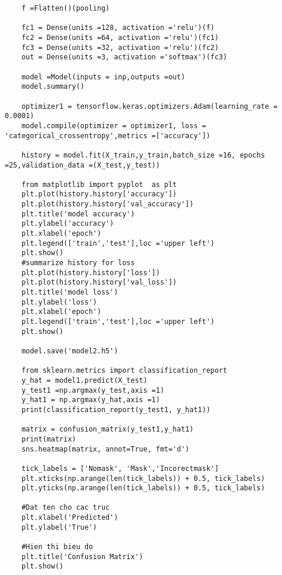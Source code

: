 \begin{lstlisting}
	f =Flatten()(pooling)
	
	fc1 = Dense(units =128, activation ='relu')(f)
	fc2 = Dense(units =64, activation ='relu')(fc1)
	fc3 = Dense(units =32, activation ='relu')(fc2)
	out = Dense(units =3, activation ='softmax')(fc3)
	
	model =Model(inputs = inp,outputs =out)
	model.summary()
	
	optimizer1 = tensorflow.keras.optimizers.Adam(learning_rate = 0.0001)
	model.compile(optimizer = optimizer1, loss = 'categorical_crossentropy',metrics =['accuracy'])
	
	history = model.fit(X_train,y_train,batch_size =16, epochs =25,validation_data =(X_test,y_test))
	
	from matplotlib import pyplot  as plt
	plt.plot(history.history['accuracy'])
	plt.plot(history.history['val_accuracy'])
	plt.title('model accuracy')
	plt.ylabel('accuracy')
	plt.xlabel('epoch')
	plt.legend(['train','test'],loc ='upper left')
	plt.show()
	#summarize history for loss
	plt.plot(history.history['loss'])
	plt.plot(history.history['val_loss'])
	plt.title('model loss')
	plt.ylabel('loss')
	plt.xlabel('epoch')
	plt.legend(['train','test'],loc ='upper left')
	plt.show()
	
	model.save('model2.h5')
	
	from sklearn.metrics import classification_report
	y_hat = model1.predict(X_test)
	y_test1 =np.argmax(y_test,axis =1)
	y_hat1 = np.argmax(y_hat,axis =1)
	print(classification_report(y_test1, y_hat1))
	
	matrix = confusion_matrix(y_test1,y_hat1)
	print(matrix)
	sns.heatmap(matrix, annot=True, fmt='d')
	
	tick_labels = ['Nomask', 'Mask','Incorectmask']
	plt.xticks(np.arange(len(tick_labels)) + 0.5, tick_labels)
	plt.yticks(np.arange(len(tick_labels)) + 0.5, tick_labels)
	
	#Dat ten cho cac truc
	plt.xlabel('Predicted')
	plt.ylabel('True')
	
	#Hien thi bieu do
	plt.title('Confusion Matrix')
	plt.show()
\end{lstlisting}

